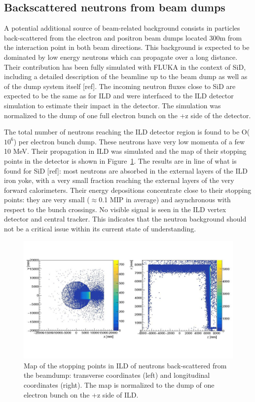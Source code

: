 \subsection{Backscattered neutrons from beam dumps}

A potential additional source of beam-related background consists in particles back-scattered from the electron and positron beam dumps located 300m from the interaction point in both beam directions. This background is expected to be dominated by low energy neutrons which can propagate over a long distance. Their contribution has been fully simulated with FLUKA in the context of SiD, including a detailed description of the beamline up to the beam dump as well as of the dump system itself [ref]. The incoming neutron fluxes close to SiD are expected to be the same as for ILD and were interfaced to the ILD detector simulation to estimate their impact in the detector. The simulation was normalized to the dump of one full electron bunch on the +z side of the detector.

The total number of neutrons reaching the ILD detector region is found to be O($10^6$) per electron bunch dump. These neutrons have very low momenta of a few 10 MeV. Their propagation in ILD was simulated and the map of their stopping points in the detector is shown in Figure~\ref{fig:integration:neutrons}. The results are in line of what is found for SiD [ref]: most neutrons are absorbed in the external layers of the ILD iron yoke, with a very small fraction reaching the external layers of the very forward calorimeters. Their energy depositions concentrate close to their stopping points: they are very small ($\approx$0.1 MIP in average) and asynchronous with respect to the bunch crossings. No visible signal is seen in the ILD vertex detector and central tracker. This indicates that the neutron background should not be a critical issue within its current state of understanding.

\begin{figure}[t!]
\includegraphics[width=1.0\hsize]{Integration/fig/BG_neutrons.jpg}
\caption{\label{fig:integration:neutrons}Map of the stopping points in ILD of neutrons back-scattered from the beamdump: transverse coordinates (left) and longitudinal coordinates (right). The map is normalized to the dump of one electron bunch on the +z side of ILD.}
\end{figure}

\vspace{2cm}